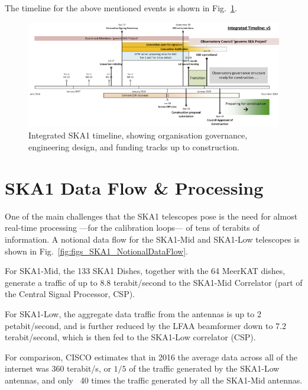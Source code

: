 \documentclass[a4paper,
               biblatex,       %
               keeplastbox,    %
               ]{jacow-2_1}    %
\begin{document}
The timeline for the above mentioned events is shown in Fig.~\ref{fig:figs_IntegratedTimeline_v5}.
 
\label{sec:ska1_timeline}
 \begin{figure}[!tb]
   \centering
     \includegraphics[width=\textwidth]{figs/IntegratedTimeline_v5.png}
   \caption{Integrated SKA1 timeline, showing organisation governance, engineering design, and funding tracks up to construction.}
   \label{fig:figs_IntegratedTimeline_v5}
 \end{figure}
 


\section{SKA1 Data Flow \& Processing} %
\label{sec:ska1_data_flow_and_processing}

One of the main challenges that the SKA1 telescopes pose is the need for almost real-time processing —for the calibration loops— of tens of terabits of information. A notional data flow for the SKA1-Mid and SKA1-Low telescopes is shown in Fig.~\ref{fig:figs_SKA1_NotionalDataFlow}.

For SKA1-Mid, the 133 SKA1 Dishes, together with the 64 MeerKAT dishes, generate a traffic of up to 8.8 terabit/second to the SKA1-Mid Correlator (part of the Central Signal Processor, CSP).

For SKA1-Low, the aggregate data traffic from the antennas is up to 2 petabit/second, and is further reduced by the LFAA beamformer down to 7.2 terabit/second, which is then fed to the SKA1-Low correlator (CSP).

For comparison, CISCO estimates that in 2016 the average data across all of the internet was 360 terabit/s, or $1/5$ of the traffic generated by the SKA1-Low antennas, and only ~40 times the traffic generated by all the SKA1-Mid antennas.
\end{document}
